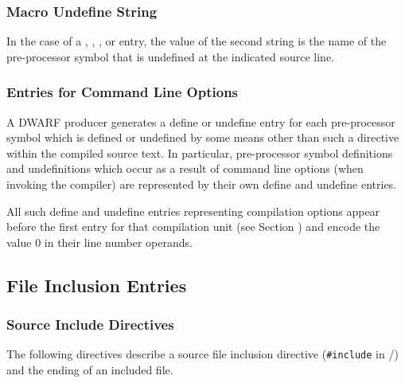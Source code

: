 \subsubsection{Macro Undefine String}
\label{chap:macroundefinestring}
In the case of a 
\DWMACROundef{},
\DWMACROundefstrp{},
\bb
\DWMACROundefstrx{},
\DWMACROundefsupfour{} or
\DWMACROundefsupeight{}
\eb
entry, the value of the second string is the name of the pre-processor
symbol that is undefined at the indicated source line.

\subsubsection{Entries for Command Line Options}
\label{chap:entriesforcommandlineoptions}
\DWMACROdefineINDX{}\DWMACROdefinestrpINDX{}\DWMACROdefinestrxINDX
\DWMACROundefINDX{}\DWMACROundefstrpINDX{}\DWMACROundefstrxINDX
A DWARF producer
generates a define or undefine entry for
each pre-processor symbol which is defined or undefined by
some means other than such a directive
within the compiled source text. In particular, pre-processor
symbol definitions and undefinitions which occur as a
result of command line options (when invoking the compiler)
are represented by their own define and
undefine entries.

All such define and undefine entries representing compilation 
options appear before the first \DWMACROstartfile{} 
entry for that compilation unit
(see Section )
and encode the value 0 in their line number operands.

\subsection{File Inclusion Entries}
\label{chap:fileinclusionentries}

\subsubsection{Source Include Directives}
\label{chap:sourceincludedirectives}

The following directives describe a source
file inclusion directive (\texttt{\#include} in
/) and the
ending of an included file.

